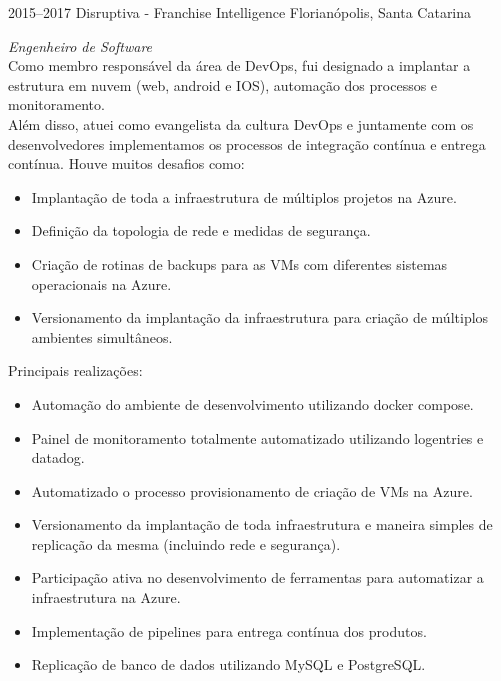 \documentclass[]{friggeri-cv} %
\begin{document}
\begin{entrylist}
\entry
{2015--2017}
{Disruptiva - Franchise Intelligence}
{Florianópolis, Santa Catarina}
{\emph{Engenheiro de Software} \\

    Como membro responsável da área de DevOps, fui designado a implantar a estrutura em nuvem
    (web, android e IOS), automação dos processos e monitoramento. \\
    Além disso, atuei como evangelista da cultura DevOps e juntamente com os desenvolvedores implementamos 
    os processos de integração contínua e entrega contínua. 
    Houve muitos desafios como:\\

\begin{itemize}
    \item Implantação de toda a infraestrutura de múltiplos projetos na Azure.
    \item Definição da topologia de rede e medidas de segurança.
    \item Criação de rotinas de backups para as VMs com diferentes sistemas operacionais na Azure.
    \item Versionamento da implantação da infraestrutura para criação de múltiplos ambientes simultâneos.
\end{itemize}

Principais realizações:

\begin{itemize}
    \item Automação do ambiente de desenvolvimento utilizando docker compose.
    \item Painel de monitoramento totalmente automatizado utilizando logentries e datadog.
    \item Automatizado o processo provisionamento de criação de VMs na Azure.
    \item Versionamento da implantação de toda infraestrutura e maneira simples de replicação da mesma (incluindo rede e segurança).
    \item Participação ativa no desenvolvimento de ferramentas para automatizar a infraestrutura na Azure.
    \item Implementação de pipelines para entrega contínua dos produtos.
    \item Replicação de banco de dados utilizando MySQL e PostgreSQL.
\end{itemize}
}
\end{entrylist}
\end{document}
